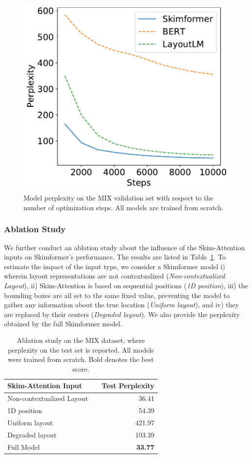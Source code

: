 \begin{figure}
    \centering \small
    \includegraphics[width=.4\textwidth]{images/chapter3/learning_curves-mix-steps10k-clean2.pdf}
    \caption{Model perplexity on the MIX validation set with respect to the number of optimization steps. All models are trained from scratch.}
    \label{fig:pretraining-learning-curves}
\end{figure}

\subsubsection{Ablation Study}

We further conduct an ablation study about the influence of the Skim-Attention inputs on Skimformer's performance. The results are listed in Table~\ref{tab:ablation-study}. To estimate the impact of the input type, we consider a Skimformer model i) wherein layout representations are not contextualized (\textit{Non-contextualized Layout}), ii) Skim-Attention is based on sequential positions (\textit{1D position}), iii) the bounding boxes are all set to the same fixed value, preventing the model to gather any information about the true location (\textit{Uniform layout}), and iv) they are replaced by their centers (\textit{Degraded layout}). We also provide the perplexity obtained by the full Skimformer model.

\begin{table}[t]
\centering \small
\begin{tabular}{lrr}
    \hline
    \textbf{Skim-Attention Input} & &\textbf{Test Perplexity}\\
    \hline
    Non-contextualized Layout  &                            & 36.41 \\
    1D position    &                     & 54.39 \\ 
    Uniform layout   &                   & 421.97 \\
    Degraded layout    &                 & 103.39 \\
    \hline 
    Full Model  &             & \textbf{33.77} \\
    \hline
\end{tabular}
\caption{Ablation study on the MIX dataset, where perplexity on the test set is reported. All models were trained from scratch. Bold denotes the best score.}
\label{tab:ablation-study}
\end{table}

